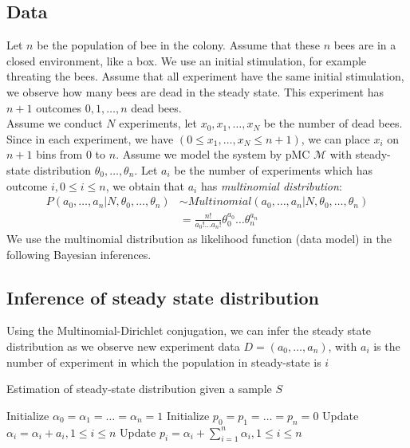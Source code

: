 \documentclass[12pt]{article}
\theoremstyle{definition}
\begin{document}
\subsection{Data}

Let $n$ be the population of bee in the colony. Assume that these $n$ bees are
in a closed environment, like a box. We use an initial stimulation, for example
threating the bees. Assume that all experiment have the same initial
stimulation, we observe how many bees are dead in the steady state. This
experiment has $n+1$ outcomes $0,1,\ldots,n$ dead bees.\\
Assume we conduct $N$ experiments, let $x_0,x_1,\ldots,x_N$ be the number of
dead bees. Since in each experiment, we have $(0 \leq x_1,\ldots,x_N \leq n+1)$,
we can place $x_i$ on $n+1$ bins from $0$ to $n$. Assume we model the system by
pMC $\mathcal{M}$ with steady-state distribution $\theta_0,\ldots,\theta_n$. Let
$a_i$ be the number of experiments which has outcome $i, 0 \leq i \leq n$, we
obtain that $a_i$ has \textit{multinomial distribution}:
\begin{align*}
  P(a_0,\ldots,a_n | N, \theta_0,\ldots,\theta_n) &\sim Multinomial(a_0,\ldots,a_n | N, \theta_0,\ldots,\theta_n) \\
                                                  &= \frac{n!}{a_0!\ldots a_n!} \theta_0^{a_0}\ldots \theta_n^{a_n}
\end{align*}
We use the multinomial distribution as likelihood function (data model) in the
following Bayesian inferences.

\subsection{Inference of steady state distribution}
Using the Multinomial-Dirichlet conjugation, we can infer the steady state
distribution as we observe new experiment data $D=(a_0,\ldots,a_n)$, with $a_i$
is the number of experiment in which the population in steady-state is $i$ 
\begin{algorithm}[H]
  \caption{Estimation of steady-state distribution given a sample $S$}\label{exp_a}
  \begin{algorithmic}[1]
    \State Initialize $\alpha_0=\alpha_1=\ldots=\alpha_n=1$
    \State Initialize $p_0=p_1=\ldots=p_n=0$
    \State Update $\alpha_i = \alpha_i + a_i, 1 \leq i \leq n$
    \State Update $p_i = \alpha_i + \sum_{i=1}^n \alpha_i, 1 \leq i \leq n$
    \EndProcedure
  \end{algorithmic}
\end{algorithm}
\end{document}

